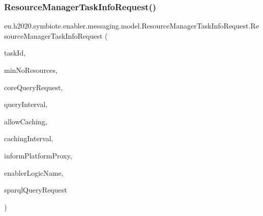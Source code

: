 \subsubsection{\texorpdfstring{Resource\+Manager\+Task\+Info\+Request()}{ResourceManagerTaskInfoRequest()}\hspace{0.1cm}{\footnotesize\ttfamily [1/2]}}
{\footnotesize\ttfamily eu.\+h2020.\+symbiote.\+enabler.\+messaging.\+model.\+Resource\+Manager\+Task\+Info\+Request.\+Resource\+Manager\+Task\+Info\+Request (\begin{DoxyParamCaption}\item[{String}]{task\+Id,  }\item[{Integer}]{min\+No\+Resources,  }\item[{\hyperlink{classeu_1_1h2020_1_1symbiote_1_1core_1_1internal_1_1CoreQueryRequest}{Core\+Query\+Request}}]{core\+Query\+Request,  }\item[{String}]{query\+Interval,  }\item[{Boolean}]{allow\+Caching,  }\item[{String}]{caching\+Interval,  }\item[{Boolean}]{inform\+Platform\+Proxy,  }\item[{String}]{enabler\+Logic\+Name,  }\item[{\hyperlink{classeu_1_1h2020_1_1symbiote_1_1core_1_1ci_1_1SparqlQueryRequest}{Sparql\+Query\+Request}}]{sparql\+Query\+Request }\end{DoxyParamCaption})}


